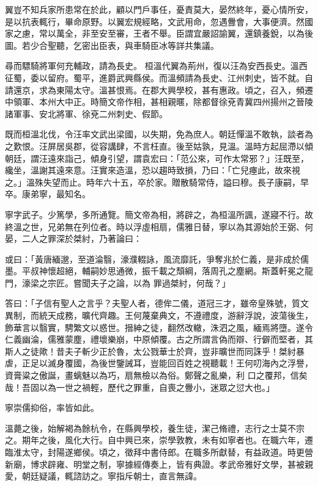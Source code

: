 \begin{pinyinscope}
 翼豈不知兵家所患常在於此，顧以門戶事任，憂責莫大，晏然終年，憂心情所安，是以抗表輒行，畢命原野。以翼宏規經略，文武用命，忽遇釁會，大事便濟。然國家之慮，常以萬全，非至安至審，王者不舉。臣謂宜嚴詔諭翼，還鎮養銳，以為後圖。若少合聖聽，乞密出臣表，與車騎臣冰等詳共集議。



 尋而驃騎將軍何充輔政，請為長史。
 桓溫代翼為荊州，復以汪為安西長史。溫西征蜀，委以留府。蜀平，進爵武興縣侯。而溫頻請為長史、江州刺史，皆不就。自請還京，求為東陽太守。溫甚恨焉。在郡大興學校，甚有惠政。頃之，召入，頻遷中領軍、本州大中正。時簡文帝作相，甚相親暱，除都督徐兗青冀四州揚州之晉陵諸軍事、安北將軍、徐兗二州刺史、假節。



 既而桓溫北伐，令汪率文武出梁國，以失期，免為庶人。朝廷憚溫不敢執，談者為之歎恨。汪屏居吳郡，從容講肆，不言枉直。後至姑孰，見溫。溫時方起屈滯以傾朝廷，謂汪遠來詣己，傾身引望，謂袁宏曰：「范公來，可作太常邪？」汪既至，
 纔坐，溫謝其遠來意。汪實來造溫，恐以趨時致損，乃曰：「亡兒瘞此，故來視之。」溫殊失望而止。時年六十五，卒於家。贈散騎常侍，謚曰穆。長子康嗣，早卒。康弟寧，最知名。



 寧字武子。少篤學，多所通覽。簡文帝為相，將辟之，為桓溫所諷，遂寢不行。故終溫之世，兄弟無在列位者。時以浮虛相扇，儒雅日替，寧以為其源始於王弼、何晏，二人之罪深於桀紂，乃著論曰：



 或曰：「黃唐緬邈，至道淪翳，濠濮輟詠，風流靡託，爭奪兆於仁義，是非成於儒墨。平叔神懷超絕，輔嗣妙思通微，振千載之頹綱，落周孔之塵網。斯蓋軒冕之龍門，濠梁之宗匠。嘗聞夫子之論，以為
 罪過桀紂，何哉？」



 答曰：「子信有聖人之言乎？夫聖人者，德侔二儀，道冠三才，雖帝皇殊號，質文異制，而統天成務，曠代齊趣。王何蔑棄典文，不遵禮度，游辭浮說，波蕩後生，飾華言以翳實，騁繁文以惑世。搢紳之徒，翻然改轍，洙泗之風，緬焉將墮。遂令仁義幽淪，儒雅蒙塵，禮壞樂崩，中原傾覆。古之所謂言偽而辯、行僻而堅者，其斯人之徒歟！昔夫子斬少正於魯，太公戮華士於齊，豈非曠世而同誅乎！桀紂暴虐，正足以滅身覆國，為後世鑒誡耳，豈能回百姓之視聽載！王何叨海內之浮譽，資膏粱之傲誕，畫螭魅以為巧，扇無檢以為俗。鄭聲之亂樂，利
 口之覆邦，信矣哉！吾固以為一世之禍輕，歷代之罪重，自喪之釁小，迷眾之愆大也。」



 寧崇儒抑俗，率皆如此。



 溫薨之後，始解褐為餘杭令，在縣興學校，養生徒，潔己脩禮，志行之士莫不宗之。期年之後，風化大行。自中興已來，崇學敦教，未有如寧者也。在職六年，遷臨淮太守，封陽遂鄉侯。頃之，徵拜中書侍郎。在職多所獻替，有益政道。時更營新廟，博求辟雍、明堂之制，寧據經傳奏上，皆有典證。孝武帝雅好文學，甚被親愛，朝廷疑議，輒諮訪之。寧指斥朝士，直言無諱。




\end{pinyinscope}
